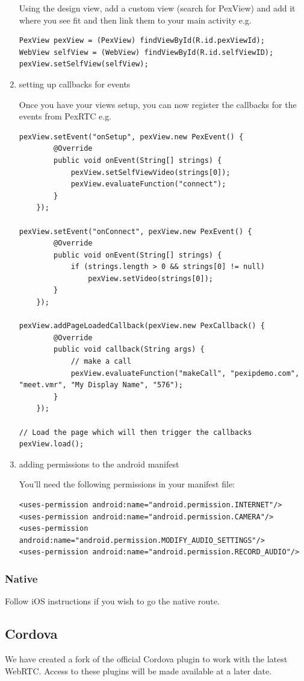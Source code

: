 \documentclass[a4paper,11pt]{article}
\begin{document}
\begin{enumerate}
Using the design view, add a custom view (search for PexView) and add
it where you see fit and then link them to your main activity e.g.

\begin{verbatim}
PexView pexView = (PexView) findViewById(R.id.pexViewId);
WebView selfView = (WebView) findViewById(R.id.selfViewID);
pexView.setSelfView(selfView);
\end{verbatim}

\item setting up callbacks for events
\label{sec:orgheadline65}

Once you have your views setup, you can now register the callbacks for
the events from PexRTC e.g.

\begin{verbatim}
pexView.setEvent("onSetup", pexView.new PexEvent() {
        @Override
        public void onEvent(String[] strings) {
            pexView.setSelfViewVideo(strings[0]);
            pexView.evaluateFunction("connect");
        }
    });

pexView.setEvent("onConnect", pexView.new PexEvent() {
        @Override
        public void onEvent(String[] strings) {
            if (strings.length > 0 && strings[0] != null)
                pexView.setVideo(strings[0]);
        }
    });

pexView.addPageLoadedCallback(pexView.new PexCallback() {
        @Override
        public void callback(String args) {
            // make a call
            pexView.evaluateFunction("makeCall", "pexipdemo.com", "meet.vmr", "My Display Name", "576");
        }
    });

// Load the page which will then trigger the callbacks
pexView.load();
\end{verbatim}

\item adding permissions to the android manifest
\label{sec:orgheadline66}

You'll need the following permissions in your manifest file:

\begin{verbatim}
<uses-permission android:name="android.permission.INTERNET"/>
<uses-permission android:name="android.permission.CAMERA"/>
<uses-permission android:name="android.permission.MODIFY_AUDIO_SETTINGS"/>
<uses-permission android:name="android.permission.RECORD_AUDIO"/>
\end{verbatim}
\end{enumerate}

\subsubsection{Native}
\label{sec:orgheadline68}

Follow iOS instructions if you wish to go the native route.

\subsection{Cordova}
\label{sec:orgheadline70}

We have created a fork of the official Cordova plugin to work with the
latest WebRTC.  Access to these plugins will be made available at a
later date.
\end{document}
